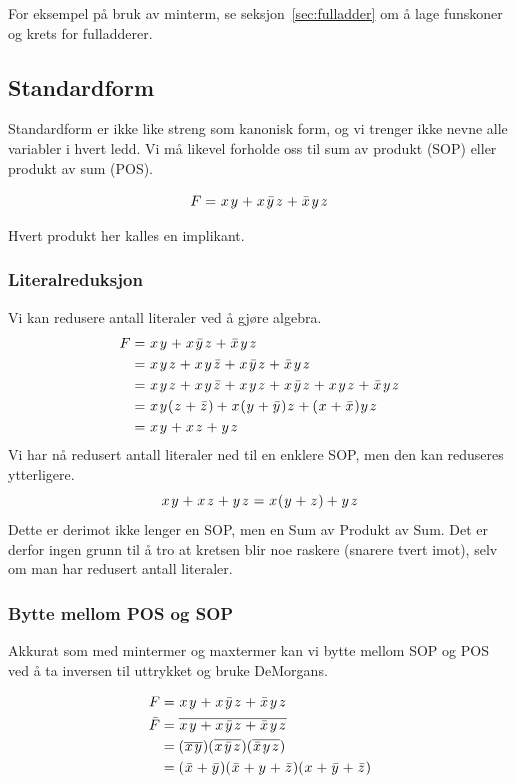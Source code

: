 \documentclass[12pt,a4paper,norsk]{article}
\begin{document}
For eksempel på bruk av minterm, se seksjon~\ref{sec:fulladder} om å lage
funskoner og krets for fulladderer.

\subsection{Standardform}
Standardform er ikke like streng som kanonisk form, og vi trenger ikke nevne alle
variabler i hvert ledd. Vi må likevel forholde oss til sum av produkt (SOP)
eller produkt av sum (POS).

\[F = \var{x}\var{y} + \var{x}\kom{y}\var{z} + \kom{x}\var{y}\var{z}\]

Hvert produkt her kalles en implikant.

\subsubsection{Literalreduksjon}
Vi kan redusere antall literaler ved å gjøre algebra.
\begin{align*}
  F &= \var{x}\var{y} + \var{x}\kom{y}\var{z} + \kom{x}\var{y}\var{z} \\
    &= \var{x}\var{y}\var{z} + \var{x}\var{y}\kom{z} + \var{x}\kom{y}\var{z} + \kom{x}\var{y}\var{z} \\
    &= \var{x}\var{y}\var{z} + \var{x}\var{y}\kom{z} + \var{x}\var{y}\var{z} + \var{x}\kom{y}\var{z} + \var{x}\var{y}\var{z} + \kom{x}\var{y}\var{z} \\
    &= \var{x}\var{y}(\var{z} + \kom{z}) + \var{x}(\var{y} + \kom{y})\var{z} + (\var{x} + \kom{x})\var{y}\var{z} \\
    &= \var{x}\var{y} + \var{x}\var{z} + \var{y}\var{z}
\end{align*}
Vi har nå redusert antall literaler ned til en enklere SOP, men den kan
reduseres ytterligere.
\[\var{x}\var{y} + \var{x}\var{z} + \var{y}\var{z} = \var{x}(\var{y} + \var{z}) + \var{y}\var{z}\]
Dette er derimot ikke lenger en SOP, men en Sum av Produkt av Sum. Det er derfor
ingen grunn til å tro at kretsen blir noe raskere (snarere tvert imot), selv om
man har redusert antall literaler.

\subsubsection{Bytte mellom POS og SOP}
Akkurat som med mintermer og maxtermer kan vi bytte mellom SOP og POS ved å ta
inversen til uttrykket og bruke DeMorgans.

\begin{align*}
  F &= \var{x}\var{y} + \var{x}\kom{y}\var{z} + \kom{x}\var{y}\var{z} \\
  \bar{F} &= \overline{\var{x}\var{y} + \var{x}\kom{y}\var{z} + \kom{x}\var{y}\var{z}} \\
    &= (\overline{\var{x}\var{y}})(\overline{\var{x}\kom{y}\var{z}})(\overline{\kom{x}\var{y}\var{z}}) \\
    &= (\kom{x} + \kom{y})(\kom{x}+\var{y}+\kom{z})(\var{x}+\kom{y}+\kom{z})
\end{align*}
\end{document}
